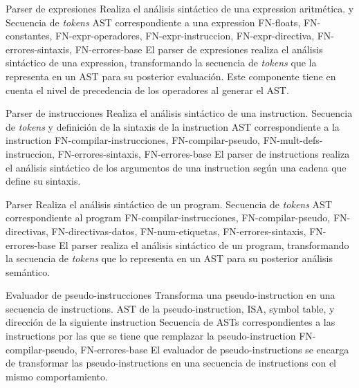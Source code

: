 \begin{component}{Parser de expresiones}
    {Realiza el análisis sintáctico de una \gls{expression} aritmética.} %
    { y } %
    {Secuencia de \textit{\glspl{token}}} %
    {\gls{AST} correspondiente a una \gls{expression}} %
    {FN-floats, FN-constantes, FN-expr-operadores,
    FN-expr-instruccion, FN-expr-directiva, FN-errores-sintaxis, FN-errores-base} %
    El \gls{parser} de expresiones realiza el análisis sintáctico de una
    \gls{expression}, transformando la secuencia de \textit{\glspl{token}} que la
    representa en un \gls{AST} para su posterior evaluación. Este componente
    tiene en cuenta el nivel de precedencia de los operadores al generar el
    \gls{AST}.
\end{component}

\begin{component}{Parser de instrucciones}
    {Realiza el análisis sintáctico de una \gls{instruction}.} %
    {} %
    {Secuencia de \textit{\glspl{token}} y definición de la sintaxis de la \gls{instruction}} %
    {\gls{AST} correspondiente a la \gls{instruction}} %
    {FN-compilar-instrucciones, FN-compilar-pseudo,
    FN-mult-defs-instruccion, FN-errores-sintaxis, FN-errores-base} %
    El \gls{parser} de \glspl{instruction} realiza el análisis sintáctico de los
    argumentos de una \gls{instruction} según una cadena que define su sintaxis.
\end{component}

\begin{component}{Parser}
    {Realiza el análisis sintáctico de un \gls{program}.} %
    {} %
    {Secuencia de \textit{\glspl{token}}} %
    {\gls{AST} correspondiente al \gls{program}} %
    {FN-compilar-instrucciones, FN-compilar-pseudo, FN-directivas,
    FN-directivas-datos, FN-num-etiquetas, FN-errores-sintaxis, FN-errores-base} %
    El \gls{parser} realiza el análisis sintáctico de un \gls{program},
    transformando la secuencia de \textit{\glspl{token}} que lo representa en un
    \gls{AST} para su posterior análisis semántico.
\end{component}

\begin{component}{Evaluador de pseudo-instrucciones}
    {Transforma una \gls{pseudo-instruction} en una secuencia de \glspl{instruction}.} %
    {} %
    {\gls{AST} de la \gls{pseudo-instruction}, \gls{ISA}, \gls{symbol table}, y dirección de la siguiente \gls{instruction}} %
    {Secuencia de \glspl{AST} correspondientes a las \glspl{instruction} por las que se tiene que remplazar la \gls{pseudo-instruction}} %
    {FN-compilar-pseudo, FN-errores-base} %
    El evaluador de \glspl{pseudo-instruction} se encarga de transformar las
    \glspl{pseudo-instruction} en una secuencia de \glspl{instruction} con el
    mismo comportamiento.
\end{component}


